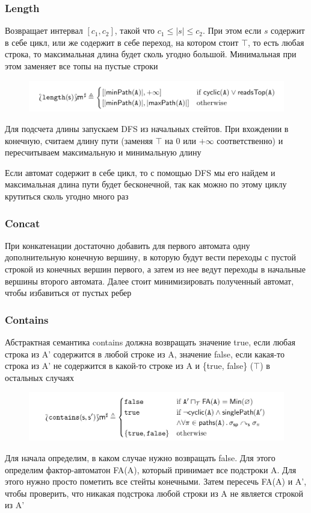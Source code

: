\subsubsection*{Length}
Возвращает интервал $[c_1, c_2]$, такой что $c_1 \leq |s| \leq c_2$. При этом если $s$ содержит в себе цикл, или же содержит в себе переход, на котором стоит $\top$, то есть любая строка, то максимальная длина будет сколь угодно большой. Минимальная при этом заменяет все топы на пустые строки
\begin{figure}[H]
\includegraphics[width=\textwidth]{images/tarsis-length.png}\hfill
\end{figure}

Для подсчета длины запускаем DFS из начальных стейтов. При вхождении в конечную, считаем длину пути (заменяя $\top$ на $0$ или $+\infty$ соответственно) и пересчитываем максимальную и минимальную длину

Если автомат содержит в себе цикл, то с помощью DFS мы его найдем и максимальная длина пути будет бесконечной, так как можно по этому циклу крутиться сколь угодно много раз

\subsubsection*{Concat}
При конкатенации достаточно добавить для первого автомата одну дополнительную конечную вершину, в которую будут вести переходы с пустой строкой из конечных вершин первого, а затем из нее ведут переходы в начальные вершины второго автомата. Далее стоит минимизировать полученный автомат, чтобы избавиться от пустых ребер

\newpage
\subsubsection*{Contains}
Абстрактная семантика contains должна возвращать значение true, если любая строка из A' содержится в любой строке из A, значение false, если какая-то строка из A' не содержится в какой-то строке из A и \{true, false\} ($\top$) в остальных случаях
\begin{figure}[H]
\includegraphics[width=\textwidth]{images/tarsis-contains.png}\hfill
\end{figure}
Для начала определим, в каком случае нужно возвращать false. Для этого определим фактор-автоматон FA(A), который принимает все подстроки A. Для этого нужно просто пометить все стейты конечными. Затем пересечь FA(A) и A', чтобы проверить, что никакая подстрока любой строки из A не является строкой из A'

